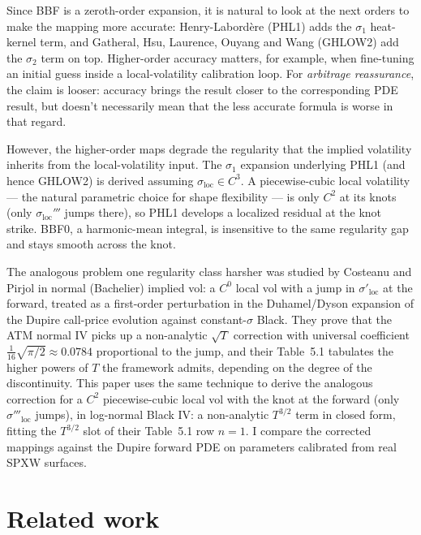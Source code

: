 \documentclass[11pt]{article}
\begin{document}
Since BBF is a zeroth-order expansion, it is natural to look at the
next orders to make the mapping more accurate: Henry-Labord\`ere
(PHL1) \citep{henrylabordere2008} adds the $\sigma_1$ heat-kernel
term, and Gatheral, Hsu, Laurence, Ouyang and Wang (GHLOW2)
\citep{gatheral2012} add the $\sigma_2$ term on top. Higher-order
accuracy matters, for example, when fine-tuning an initial guess
inside a local-volatility calibration loop. For \emph{arbitrage
reassurance}, the claim is looser: accuracy brings the result closer
to the corresponding PDE result, but doesn't necessarily mean that
the less accurate formula is worse in that regard.

However, the higher-order maps degrade the regularity that the
implied volatility inherits from the local-volatility input. The
$\sigma_1$ expansion underlying PHL1 (and hence GHLOW2) is derived
assuming $\sigma_{\mathrm{loc}}\in C^3$. A piecewise-cubic local
volatility --- the natural parametric choice for shape flexibility
--- is only $C^2$ at its knots (only $\sigma_{\mathrm{loc}}'''$ jumps
there), so PHL1 develops a localized residual at the knot strike.
BBF0, a harmonic-mean integral, is insensitive to the same regularity
gap and stays smooth across the knot.

The analogous problem one regularity class harsher was studied by
Costeanu and Pirjol \citep{costeanuPirjol2011} in normal (Bachelier)
implied vol: a $C^0$ local vol with a jump in
$\sigma'_{\mathrm{loc}}$ at the forward, treated as a first-order
perturbation in the Duhamel/Dyson expansion of the Dupire
call-price evolution against constant-$\sigma$ Black. They prove
that the ATM normal IV picks up a non-analytic $\sqrt{T}$ correction
with universal coefficient $\tfrac{1}{16}\sqrt{\pi/2}\approx 0.0784$
proportional to the jump, and their Table~5.1 tabulates the higher
powers of $T$ the framework admits, depending on the degree of the
discontinuity. This paper uses the same
technique to derive the analogous correction for a $C^2$
piecewise-cubic local vol with the knot at the forward (only
$\sigma'''_{\mathrm{loc}}$ jumps), in log-normal Black IV: a
non-analytic $T^{3/2}$ term in closed form, fitting the $T^{3/2}$
slot of their Table~5.1 row $n=1$. I compare the corrected mappings
against the Dupire forward PDE \citep{dupire1994} on parameters
calibrated from real SPXW surfaces.


\section{Related work}
\end{document}
